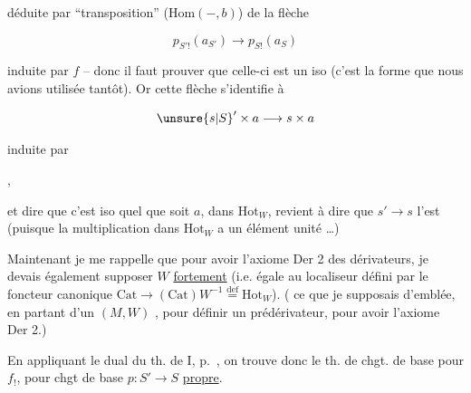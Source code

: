 
déduite par ``transposition'' ($\mathrm{Hom}(-,b)$) de la flèche

\[
 p_{S'!}(a_{S'})\longrightarrow p_{S!}(a_S)
\]

induite par $f$ -- donc il faut prouver que celle-ci est un iso (c'est la forme que nous avions utilisée tantôt). Or cette flèche s'identifie à

\[
 \unsure{s|S}'\times a\longrightarrow s\times a
\]

induite par


,

et dire que c'est iso quel que soit $a$, dans $\mathrm{Hot}_W$, revient à dire que $s'\longrightarrow s$ l'est (puisque la multiplication dans $\mathrm{Hot}_W$ a un élément unité \ldots)

Maintenant je me rappelle que pour avoir l'axiome Der 2 des dérivateurs, je devais également supposer $W$ \uline{fortement}  (i.e. égale au localiseur défini par le foncteur canonique $\mathrm{Cat}\longrightarrow(\mathrm{Cat})W^{-1}\overset{\mathrm{def}}{=}\mathrm{Hot}_W$). ( ce que je supposais d'emblée, en partant d'un $(M,W)$ , pour définir un prédérivateur, pour avoir l'axiome Der 2.)

En appliquant le dual du th. de I, p.~, on trouve donc le th. de chgt. de base pour $f_!$, pour chgt de base $p:S'\longrightarrow S$ \uline{propre}.

